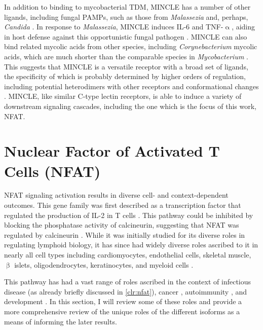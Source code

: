 In addition to binding to mycobacterial TDM, MINCLE has a number of other ligands, including fungal PAMPs, such as those from \textit{Malassezia} and, perhaps, \textit{Candida} \citep{Yamasaki2009, Wells2008, Ishikawa2013}. In response to \textit{Malassezia}, MINCLE induces IL\hyp{}6 and TNF\hyp{}$\upalpha$, aiding in host defense against this opportunistic fungal pathogen \citep{Lu2018}. MINCLE can also bind related mycolic acids from other species, including \textit{Corynebacterium} mycolic acids, which are much shorter than the comparable species in \textit{Mycobacterium} \citep{vanderPeet2015}. This suggests that MINCLE is a versatile receptor with a broad set of ligands, the specificity of which is probably determined by higher orders of regulation, including potential heterodimers with other receptors and conformational changes \citep{Jegouzo2014}. MINCLE, like similar C\hyp{}type lectin receptors, is able to induce a variety of downstream signaling cascades, including the one which is the focus of this work, NFAT.

\section{Nuclear Factor of Activated T Cells (NFAT)}\label{NFAT}

NFAT signaling activation results in diverse cell\hyp{} and context\hyp{}dependent outcomes. This gene family was first described as a transcription factor that regulated the production of IL\hyp{}2 in T cells \citep{Shaw1988, Jain1993, Northrop1994}. This pathway could be inhibited by blocking the phosphatase activity of calcineurin, suggesting that NFAT was regulated by calcineurin \citep{Jain1993, Loh1996}. While it was initially studied for its diverse roles in regulating lymphoid biology, it has since had widely diverse roles ascribed to it in nearly all cell types including cardiomyocytes, endothelial cells, skeletal muscle, $\upbeta$ islets, oligodendrocytes, keratinocytes, and myeloid cells \citep{Horsley2002, Crabtree2002, Fric2012b, Kegley2001, Stevenson2001, Weider2018, AlDaraji2002, Muller2010}. 

This pathway has had a vast range of roles ascribed in the context of infectious disease (as already briefly discussed in \autoref{clr:nfat}), cancer \citep{Muller2010}, autoimmunity \citep{Park2020}, and development \citep{Horsley2002, Crabtree2002}. In this section, I will review some of these roles and provide a more comprehensive review of the unique roles of the different isoforms as a means of informing the later results. 

